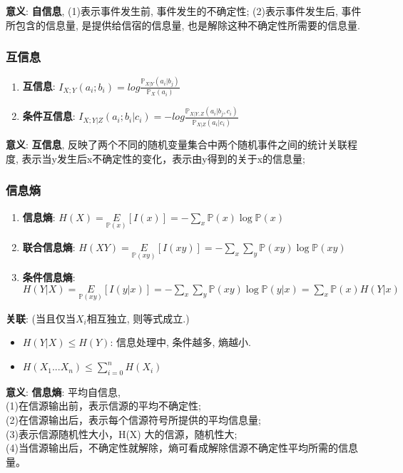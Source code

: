 \documentclass{article}
\newcommand{\env}[2]{\begin{#1}#2\end{#1}}
\begin{document}
            \textbf{意义}: \textbf{自信息}, (1)表示事件发生前, 事件发生的不确定性; (2)表示事件发生后, 事件所包含的信息量, 是提供给信宿的信息量, 也是解除这种不确定性所需要的信息量. 

        \subsubsection{互信息}
            \env{enumerate}{
                \item \textbf{互信息}: $I_{X;Y}(a_i;b_i) = log\frac{\mathbb P_{X|Y}(a_i|b_j)}{\mathbb P_X(a_i)}$
                \item \textbf{条件互信息}: $I_{X;Y|Z}(a_i;b_i|c_i) = -log\frac{\mathbb P_{X|Y,Z}(a_i|b_j, c_i)}{\mathbb P_{X|Z}(a_i|c_i)}$
            }

            \textbf{意义}: \textbf{互信息}, 反映了两个不同的随机变量集合中两个随机事件之间的统计关联程度, 表示当y发生后x不确定性的变化，表示由y得到的关于x的信息量;

        \subsubsection{信息熵}
            \env{enumerate}{
                \item \textbf{信息熵}: $H(X) = \underset{\mathbb P(x)}{E}[I(x)] = -\sum\limits_x \mathbb P(x)\log \mathbb P(x)$
                \item \textbf{联合信息熵}: $H(XY) = \underset{\mathbb P(xy)}{E}[I(xy)] = -\sum\limits_x \sum\limits_y \mathbb P(xy) \log \mathbb P(xy)$
                \item \textbf{条件信息熵}: $H(Y|X) = \underset{\mathbb P(xy)}{E}[I(y|x)] = -\sum\limits_x \sum\limits_y \mathbb P(xy) \log \mathbb P(y|x) = \sum\limits_x \mathbb P(x) H(Y|x)$
            }
            
            \textbf{关联}: (当且仅当$X_i$相互独立, 则等式成立.)
            \env{itemize}{
                \item $H(Y|X) \le H(Y)$: 信息处理中, 条件越多, 熵越小.
                \item $H(X_1...X_n) \le \sum\limits_{i=0}^n H(X_i)$
            }
            
            \textbf{意义}: \textbf{信息熵}: 平均自信息, \\
            (1)在信源输出前，表示信源的平均不确定性;\\
            (2)在信源输出后，表示每个信源符号所提供的平均信息量;\\
            (3)表示信源随机性大小，H(X) 大的信源，随机性大;\\
            (4)当信源输出后，不确定性就解除，熵可看成解除信源不确定性平均所需的信息量。
            
\end{document}
